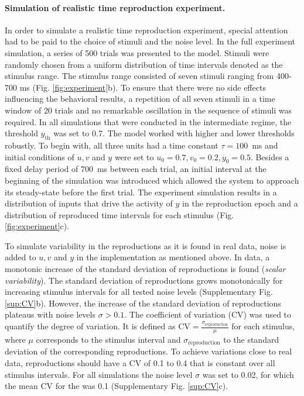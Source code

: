 \documentclass[10pt]{article}
\begin{document}
\paragraph{Simulation of realistic time reproduction experiment.}
In order to simulate a realistic time reproduction experiment, special attention had to be paid to the choice of stimuli and the noise level.  
In the full experiment simulation, a series of 500 trials was presented to the model.
Stimuli were randomly chosen from a uniform distribution of time intervals denoted as the stimulus range. 
The stimulus range consisted of seven stimuli ranging from 400-700 ms (Fig. \ref{fig:experiment}b).
To ensure that there were no side effects influencing the behavioral results, a repetition of all seven stimuli in a time window of 20 trials and no remarkable oscillation in the sequence of stimuli was required.
In all simulations that were conducted in the intermediate regime, the threshold $y_\text{th}$ was set to 0.7. The model worked with higher and lower thresholds robustly. 
To begin with, all three units had a time constant $\tau = 100$~ms and initial conditions of $u, v$ and $y$ were set to $u_0=0.7, v_0=0.2, y_0=0.5$.
Besides a fixed delay period of 700~ms between each trial, an initial interval at the beginning of the simulation was introduced which allowed the system to approach its steady-state before the first trial. 
The experiment simulation results in a distribution of inputs that drive the activity of $y$ in the reproduction epoch and a distribution of reproduced time intervals for each stimulus (Fig. \ref{fig:experiment}c).

To simulate variability in the reproductions as it is found in real data, noise is added to $u, v$ and $y$ in the implementation as mentioned above. In data, a monotonic increase of the standard deviation of reproductions is found (\textit{scalar variability}). 
The standard deviation of reproductions grows monotonically for increasing stimulus intervals for all tested noise levels (Supplementary Fig. \ref{sup:CV}b).
However, the increase of the standard deviation of reproductions plateaus with noise levels $\sigma > 0.1$.
The coefficient of variation (CV) was used to quantify the degree of variation. It is defined as $\text{CV}=\frac{\sigma_\text{reproduction}}{\mu}$ for each stimulus, where $\mu$ corresponds to the stimulus interval and $\sigma_\text{reproduction}$ to the standard deviation of the corresponding reproductions. 
To achieve variations close to real data, reproductions should have a CV of 0.1 to 0.4 that is constant over all stimulus intervals.
For all simulations the noise level $\sigma$ was set to 0.02, for which the mean CV for the was 0.1 (Supplementary Fig. \ref{sup:CV}c).
\end{document}
